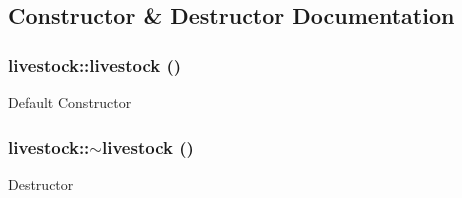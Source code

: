 \subsection{Constructor \& Destructor Documentation}
\hypertarget{classlivestock_a44943a16d8334d50dba2f804092effcb}{
\subsubsection[{livestock}]{\setlength{\rightskip}{0pt plus 5cm}livestock::livestock ()}}
\label{classlivestock_a44943a16d8334d50dba2f804092effcb}
Default Constructor \hypertarget{classlivestock_a95bbe104d3e28f65652b6dc49eb959da}{
\subsubsection[{$\sim$livestock}]{\setlength{\rightskip}{0pt plus 5cm}livestock::$\sim$livestock ()}}
\label{classlivestock_a95bbe104d3e28f65652b6dc49eb959da}
Destructor 

